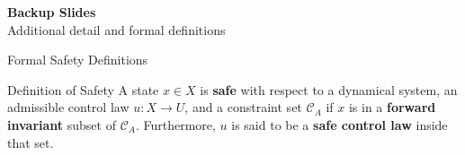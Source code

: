 
\begin{frame}[plain]
  \vfill
  \begin{center}
    {\LARGE\color{slate900}\textbf{Backup Slides}}\\[8pt]
    {\color{slate700}Additional detail and formal definitions}
  \end{center}
  \vfill
\end{frame}

\begin{frame}{Formal Safety Definitions}
  \hypertarget{backup:safety-formal}{}
  \small
  \begin{block}{Definition of Safety}
    \vspace{4pt}
    A state $x \in X$ is \textbf{safe} with respect to a dynamical system, an admissible control law $u: X \to U$, and a constraint set $\mathcal{C}_A$ if $x$ is in a \textbf{forward invariant} subset of $\mathcal{C}_A$. Furthermore, $u$ is said to be a \textbf{safe control law} inside that set.
    \vspace{4pt}
  \end{block}

  \vskip4pt
\end{frame}

